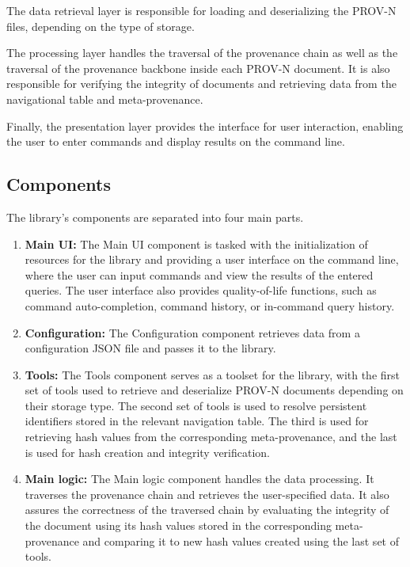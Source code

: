 \documentclass[
  digital,     %
  oneside,     %
  nosansbold,  %
  nocolorbold, %
  lof,         %
  lot,         %
]{fithesis4}
\begin{document}
The data retrieval layer is responsible for loading and deserializing the PROV-N files, depending on the type of storage. 

The processing layer handles the traversal of the provenance chain as well as the traversal of the provenance backbone inside each PROV-N document. It is also responsible for verifying the integrity of documents and retrieving data from the navigational table and meta-provenance.

Finally, the presentation layer provides the interface for user interaction, enabling the user to enter commands and display results on the command line.
\shorthandon{-}

\subsection{Components}
\shorthandoff{-}
The library's components are separated into four main parts.
\begin{enumerate}
    \item \textbf{Main UI:}
        The Main UI component is tasked with the initialization of resources for the library and providing a user interface on the command line, where the user can input commands and view the results of the entered queries. The user interface also provides quality-of-life functions, such as command auto-completion, command history, or in-command query history.
    \item \textbf{Configuration:}
        The Configuration component retrieves data from a configuration JSON file and passes it to the library.
    \item \textbf{Tools:}
        The Tools component serves as a toolset for the library, with the first set of tools used to retrieve and deserialize PROV-N documents depending on their storage type. 
        The second set of tools is used to resolve persistent identifiers stored in the relevant navigation table.
        The third is used for retrieving hash values from the corresponding meta-provenance, and the last is used for hash creation and integrity verification.
    \item \textbf{Main logic:}
        The Main logic component handles the data processing. It traverses the provenance chain and retrieves the user-specified data. It also assures the correctness of the traversed chain by evaluating the integrity of the document using its hash values stored in the corresponding meta-provenance and comparing it to new hash values created using the last set of tools.
\end{enumerate}
\shorthandon{-}
\end{document}
